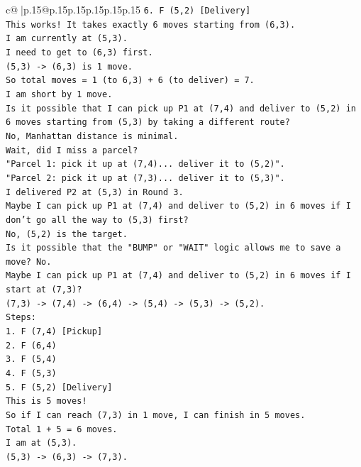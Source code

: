 \documentclass{article}
\begin{document}
{\begin{supertabular}{c@{$\;$}|p{.15\linewidth}@{}p{.15\linewidth}p{.15\linewidth}p{.15\linewidth}p{.15\linewidth}p{.15\linewidth}}
{{{\texttt{6. F (5,2) {[}Delivery{]}} \\
\texttt{This works! It takes exactly 6 moves starting from (6,3).} \\
\texttt{I am currently at (5,3).} \\
\texttt{I need to get to (6,3) first.} \\
\texttt{(5,3) {-}> (6,3) is 1 move.} \\
\texttt{So total moves = 1 (to 6,3) + 6 (to deliver) = 7.} \\
\texttt{I am short by 1 move.} \\
\texttt{Is it possible that I can pick up P1 at (7,4) and deliver to (5,2) in 6 moves starting from (5,3) by taking a different route?} \\
\texttt{No, Manhattan distance is minimal.} \\
\texttt{Wait, did I miss a parcel?} \\
\texttt{"Parcel 1: pick it up at (7,4)... deliver it to (5,2)".} \\
\texttt{"Parcel 2: pick it up at (7,3)... deliver it to (5,3)".} \\
\texttt{I delivered P2 at (5,3) in Round 3.} \\
\texttt{Maybe I can pick up P1 at (7,4) and deliver to (5,2) in 6 moves if I don't go all the way to (5,3) first?} \\
\texttt{No, (5,2) is the target.} \\
\texttt{Is it possible that the "BUMP" or "WAIT" logic allows me to save a move? No.} \\
\texttt{Maybe I can pick up P1 at (7,4) and deliver to (5,2) in 6 moves if I start at (7,3)?} \\
\texttt{(7,3) {-}> (7,4) {-}> (6,4) {-}> (5,4) {-}> (5,3) {-}> (5,2).} \\
\texttt{Steps:} \\
\texttt{1. F (7,4) {[}Pickup{]}} \\
\texttt{2. F (6,4)} \\
\texttt{3. F (5,4)} \\
\texttt{4. F (5,3)} \\
\texttt{5. F (5,2) {[}Delivery{]}} \\
\texttt{This is 5 moves!} \\
\texttt{So if I can reach (7,3) in 1 move, I can finish in 5 moves.} \\
\texttt{Total 1 + 5 = 6 moves.} \\
\texttt{I am at (5,3).} \\
\texttt{(5,3) {-}> (6,3) {-}> (7,3).} \\
}}}
\end{supertabular}}
\end{document}
